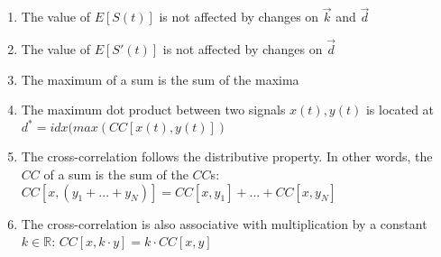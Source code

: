 \documentclass[11pt]{scrartcl} %
\begin{document}
  \begin{enumerate}
  \item The value of \(E[S{\scriptstyle (t)}]\) is not affected by changes on \(\vec{k}\) and \(\vec{d}\)
  \item The value of \(E[S'{\scriptstyle (t)}]\) is not affected by changes on \(\vec{d}\)
  \item The maximum of a sum is the sum of the maxima
  \item The maximum dot product between two signals \(x{\scriptstyle (t)},y{\scriptstyle (t)}\) is located at\\
    \(d^* = idx(max(CC[x{\scriptstyle (t)},y{\scriptstyle (t)}])\)%
  \item The cross-correlation follows the distributive property. In other words, the \(CC\) of a sum is the sum of the \(CC\)s: \(CC[x, (y_1+...+y_N)] = CC[x,y_1]+...+CC[x,y_N]\)
  \item The cross-correlation is also associative with multiplication by a constant \(k\in\mathbb{R}\): \(CC[x, k\cdot y] = k \cdot CC[x, y]\)
  \end{enumerate}
\end{document}
